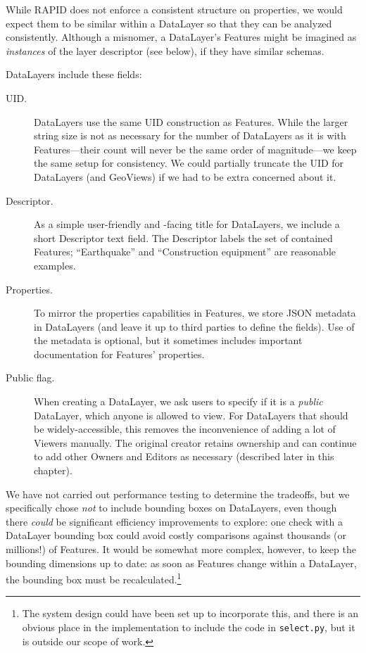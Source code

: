 While RAPID does not enforce a consistent structure on properties, we would expect them to be similar within a DataLayer so that they can be analyzed consistently. Although a misnomer, a DataLayer's Features might be imagined as \textit{instances} of the layer descriptor (see below), if they have similar schemas.

DataLayers include these fields:

\begin{description}

\item[UID.] 
DataLayers use the same UID construction as Features. While the larger string size is not as necessary for the number of DataLayers as it is with Features---their count will never be the same order of magnitude---we keep the same setup for consistency. We could partially truncate the UID for DataLayers (and GeoViews) if we had to be extra concerned about it.

\item[Descriptor.] 
As a simple user-friendly and -facing title for DataLayers, we include a short Descriptor text field. The Descriptor labels the set of contained Features; ``Earthquake'' and ``Construction equipment'' are reasonable examples.

\item[Properties.] 
To mirror the properties capabilities in Features, we store JSON metadata in DataLayers (and leave it up to third parties to define the fields). Use of the metadata is optional, but it sometimes includes important documentation for Features' properties.

\item[Public flag.] 
When creating a DataLayer, we ask users to specify if it is a \textit{public} DataLayer, which anyone is allowed to view. For DataLayers that should be widely-accessible, this removes the inconvenience of adding a lot of Viewers manually. The original creator retains ownership and can continue to add other Owners and Editors as necessary (described later in this chapter).
  
\end{description}

 We have not carried out performance testing to determine the tradeoffs, but we specifically chose \textit{not} to include bounding boxes on DataLayers, even though there \textit{could} be significant efficiency improvements to explore: one check with a DataLayer bounding box could avoid costly comparisons against thousands (or millions!) of Features. It would be somewhat more complex, however, to keep the bounding dimensions up to date: as soon as Features change within a DataLayer, the bounding box must be recalculated.\footnote{The system design could have been set up to incorporate this, and there is an obvious place in the implementation to include the code in \texttt{select.py}, but it is outside our scope of work.}

